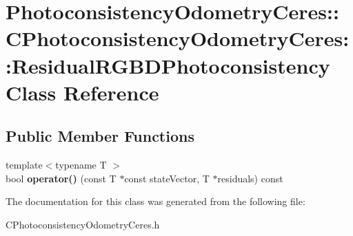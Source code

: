 \hypertarget{class_photoconsistency_odometry_ceres_1_1_c_photoconsistency_odometry_ceres_1_1_residual_r_g_b_d_photoconsistency}{
\section{PhotoconsistencyOdometryCeres::CPhotoconsistencyOdometryCeres::ResidualRGBDPhotoconsistency Class Reference}
\label{class_photoconsistency_odometry_ceres_1_1_c_photoconsistency_odometry_ceres_1_1_residual_r_g_b_d_photoconsistency}
}
\subsection*{Public Member Functions}
\begin{DoxyCompactItemize}
\item 
\hypertarget{class_photoconsistency_odometry_ceres_1_1_c_photoconsistency_odometry_ceres_1_1_residual_r_g_b_d_photoconsistency_af66bcdb3ca72f42544031dffb4ef795a}{
{\footnotesize template$<$typename T $>$ }\\bool {\bfseries operator()} (const T $\ast$const stateVector, T $\ast$residuals) const }
\label{class_photoconsistency_odometry_ceres_1_1_c_photoconsistency_odometry_ceres_1_1_residual_r_g_b_d_photoconsistency_af66bcdb3ca72f42544031dffb4ef795a}

\end{DoxyCompactItemize}


The documentation for this class was generated from the following file:\begin{DoxyCompactItemize}
\item 
CPhotoconsistencyOdometryCeres.h\end{DoxyCompactItemize}
